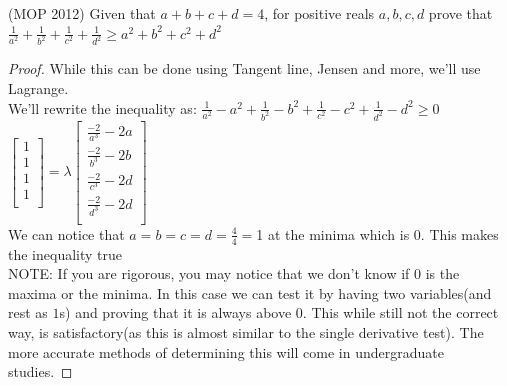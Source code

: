 \begin{example}
(MOP 2012)
Given that $a + b + c + d = 4$, for positive reals $a, b, c, d$ prove that\\
$\frac{1}{a^2}+\frac{1}{b^2}+\frac{1}{c^2}+\frac{1}{d^2} \geq a^2+b^2+c^2+d^2$
\end{example}
\begin{proof}
    While this can be done using Tangent line, Jensen and more, we'll use Lagrange.\\
    We'll rewrite the inequality as: $\frac{1}{a^2}-a^2+\frac{1}{b^2}-b^2+\frac{1}{c^2}-c^2+\frac{1}{d^2}-d^2 \geq 0$
    $\begin{bmatrix}
        1\\
        1\\
        1\\
        1\\
    \end{bmatrix} = \lambda \begin{bmatrix}
        \frac{-2}{a^3}-2a\\
        \frac{-2}{b^3}-2b\\
        \frac{-2}{c^3}-2d\\
        \frac{-2}{d^3}-2d\\
    \end{bmatrix}$\\
    We can notice that $a=b=c=d=\frac{4}{4}=$1 at the minima which is $0$. This makes the inequality true\\
    NOTE: If you are rigorous, you may notice that we don't know if $0$ is the maxima or the minima. In this case we can test it by having two variables(and rest as $1$s) and proving that it is always above $0$. This while still not the correct way, is satisfactory(as this is almost similar to the single derivative test). The more accurate methods of determining this will come in undergraduate studies. 
\end{proof}

